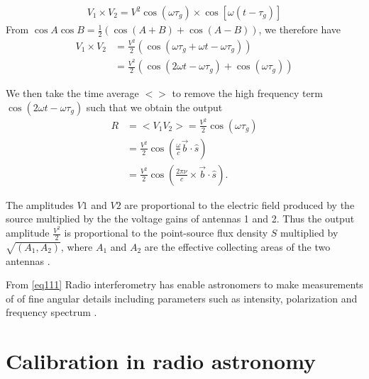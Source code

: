 \begin{align}
V_1 \times V_2 = V^2 \cos(\omega\tau_{g})\times \cos[\omega(t-\tau_{g})]
\end{align}
From $\cos A\cos B= \frac{1}{2} \left(\cos (A+B) + \cos (A-B) \right)$, 
we therefore have 
\begin{align*}
V_1 \times V_2&= \frac{V^2}{2} \left( \cos(\omega\tau_{g} + \omega t-\omega \tau_{g} )\right)\\
&= \frac{V^2}{2} \left(\cos(2\omega t - \omega \tau_{g}) + \cos (\omega\tau_{g})\right)
\end{align*}

We then take the time average $<>$ to remove the high frequency term $\cos(2\omega t - \omega \tau_{g})$ such that we obtain the output 
\begin{align}
R&= <V_1V_2> = \frac{V^2}{2}  \cos (\omega\tau_{g})\\
  &= \frac{V^2}{2}  \cos \left( \frac{\omega}{c} \overrightarrow{b} \cdot \widehat{s} \right)\\
   &= \frac{V^2}{2}  \cos \left( \frac{2\pi \nu}{c} \times
   \overrightarrow{b} \cdot \widehat{s} \right). 
\end{align}

The amplitudes $V1$ and $V2$ are proportional to the electric field produced by the  source multiplied by the the voltage gains of antennas 1 and 2.  Thus the output amplitude $\frac{V^2}{2}$ is proportional to the point-source flux density $S$ multiplied by $\sqrt{(A_1, A_2)}$, where $A_1$ and $A_2$ are the effective collecting areas of the two antennas \citep{NRAO}.

From \ref{eq111} 
Radio interferometry has enable astronomers to make measurements of  of fine angular  details including parameters such as intensity, polarization and frequency spectrum \citep{thompson2001interferometry}.

\section{Calibration in radio astronomy}
\label{Calibr}
